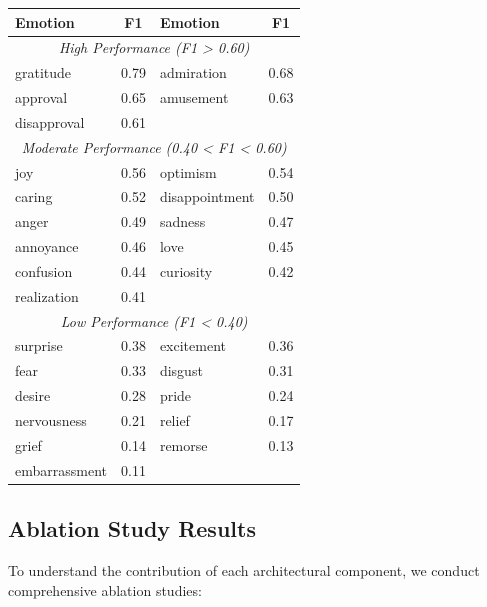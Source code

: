 \documentclass[12pt,a4paper]{article}
\begin{document}
\begin{tablebox}
\centering
\caption{Per-Emotion F1-Scores (CNN-BiLSTM Model)}
\label{tab:emotion_results}
\small
\begin{tabular}{lc|lc}
\toprule
\textbf{Emotion} & \textbf{F1} & \textbf{Emotion} & \textbf{F1} \\
\midrule
\multicolumn{4}{c}{\textit{High Performance (F1 > 0.60)}} \\
\midrule
gratitude & 0.79 & admiration & 0.68 \\
approval & 0.65 & amusement & 0.63 \\
disapproval & 0.61 & & \\
\midrule
\multicolumn{4}{c}{\textit{Moderate Performance (0.40 < F1 < 0.60)}} \\
\midrule
joy & 0.56 & optimism & 0.54 \\
caring & 0.52 & disappointment & 0.50 \\
anger & 0.49 & sadness & 0.47 \\
annoyance & 0.46 & love & 0.45 \\
confusion & 0.44 & curiosity & 0.42 \\
realization & 0.41 & & \\
\midrule
\multicolumn{4}{c}{\textit{Low Performance (F1 < 0.40)}} \\
\midrule
surprise & 0.38 & excitement & 0.36 \\
fear & 0.33 & disgust & 0.31 \\
desire & 0.28 & pride & 0.24 \\
nervousness & 0.21 & relief & 0.17 \\
grief & 0.14 & remorse & 0.13 \\
embarrassment & 0.11 & & \\
\bottomrule
\end{tabular}
\end{tablebox}

\subsection{Ablation Study Results}

To understand the contribution of each architectural component, we conduct comprehensive ablation studies:
\end{document}

